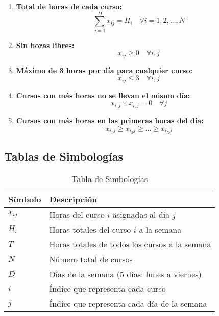 \documentclass[12pt]{article}
\begin{document}
\begin{enumerate}
    \item \textbf{Total de horas de cada curso:}
    \begin{equation}
    \sum_{j=1}^{D} x_{ij} = H_i \quad \forall i = 1, 2, \ldots, N
    \end{equation}

    \item \textbf{Sin horas libres:}
    \begin{equation}
    x_{ij} \geq 0 \quad \forall i, j
    \end{equation}

    \item \textbf{Máximo de 3 horas por día para cualquier curso:}
    \begin{equation}
    x_{ij} \leq 3 \quad \forall i, j
    \end{equation}

    \item \textbf{Cursos con más horas no se llevan el mismo día:}
    \begin{equation}
    x_{i_1j} \times x_{i_2j} = 0 \quad \forall j
    \end{equation}

    \item \textbf{Cursos con más horas en las primeras horas del día:}
    \begin{equation}
    x_{i_1j} \geq x_{i_2j} \geq \ldots \geq x_{i_Nj}
    \end{equation}
\end{enumerate}

\subsection{Tablas de Simbologías}

\begin{table}[H]
\centering
\begin{tabular}{ll}
\hline
\textbf{Símbolo} & \textbf{Descripción} \\
\hline
$x_{ij}$ & Horas del curso $i$ asignadas al día $j$ \\
$H_i$ & Horas totales del curso $i$ a la semana \\
$T$ & Horas totales de todos los cursos a la semana \\
$N$ & Número total de cursos \\
$D$ & Días de la semana (5 días: lunes a viernes) \\
$i$ & Índice que representa cada curso \\
$j$ & Índice que representa cada día de la semana \\
\hline
\end{tabular}
\caption{Tabla de Simbologías}
\end{table}
\end{document}
